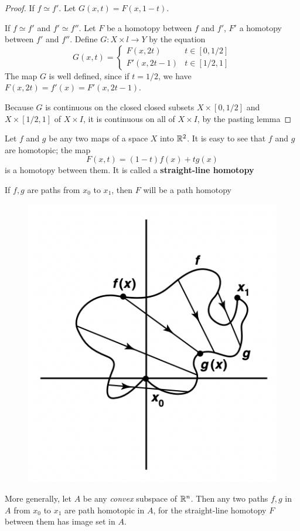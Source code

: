 \documentclass[11pt]{article}
\begin{document}
\begin{proof}
If \(f\simeq f'\). Let \(G(x,t)=F(x,1-t)\).

If \(f\simeq f'\) and \(f'\simeq f''\). Let \(F\) be a homotopy between \(f\) and \(f'\), \(F'\) a homotopy
between \(f'\) and \(f''\). Define \(G:X\times l\to Y\) by the equation
\begin{equation*}
G(x,t)=
\begin{cases}
F(x,2t)&t\in[0,1/2]\\
F'(x,2t-1)&t\in[1/2,1]
\end{cases}
\end{equation*}
The map \(G\) is well defined, since if \(t=1/2\), we have \(F(x,2t)=f'(x)=F'(x,2t-1)\).

Because \(G\) is continuous on the closed closed subsets \(X\times[0,1/2]\) and \(X\times[1/2,1]\)
of \(X\times I\), it is continuous on all of \(X\times I\), by the pasting lemma
\end{proof}

\begin{examplle}[]
Let \(f\) and \(g\) be any two maps of a space \(X\) into \(\mathbb{R}^2\). It is easy to see that \(f\)
and \(g\) are homotopic; the map
\begin{equation*}
F(x,t)=(1-t)f(x)+tg(x)
\end{equation*}
is a homotopy between them. It is called a \textbf{straight-line homotopy}

If \(f,g\) are paths from \(x_0\) to \(x_1\), then \(F\) will be a path homotopy

\begin{figure}[htbp]
\centering
\includegraphics[width=.4\textwidth]{../images/Topology/10.png}
\label{}
\end{figure}

More generally, let \(A\) be any \emph{convex} subspace of \(\mathbb{R}^n\). Then any two paths \(f,g\) in \(A\)
from \(x_0\) to \(x_1\) are path homotopic in \(A\), for the straight-line homotopy \(F\) between
them has image set in \(A\).
\end{examplle}
\end{document}
